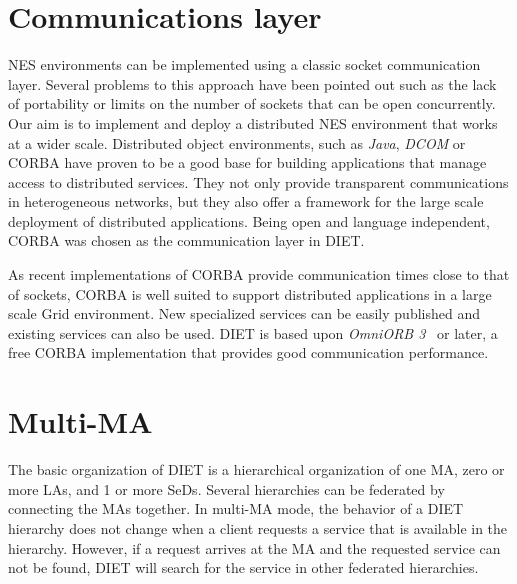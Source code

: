 
\section{Communications layer}
\label{sec:CORBA}

NES environments can be implemented using a classic socket
communication layer.  Several problems to this approach have been
pointed out such as the lack of portability or limits on the
number of sockets that can be open concurrently.
Our aim is to implement and deploy a distributed NES
environment that works at a wider scale. Distributed object
environments, such as \emph{Java}, \emph{DCOM} or CORBA have proven to
be a good base for building applications that manage access to
distributed services. They not only provide transparent communications
in heterogeneous networks, but they also offer a framework for the
large scale deployment of distributed applications. Being open and
language independent, CORBA was chosen as the communication layer in
DIET.

As recent implementations of CORBA provide communication times close to
that of sockets, CORBA is well suited to support distributed 
applications in a large scale Grid environment. New specialized
services can be easily published and existing services can also be
used.  DIET is based upon \emph{OmniORB 3}~\cite{OMNIORB} or later,
a free CORBA implementation that provides good communication
performance.


\section{Multi-MA}
\label{init:multima}

The basic organization of DIET is a hierarchical organization of one
MA, zero or more LAs, and 1 or more SeDs. Several hierarchies can be
federated by connecting the MAs together. In multi-MA mode, the
behavior of a DIET hierarchy does not change when a client requests
a service that is available in the hierarchy.  However, if a request
arrives at the MA and the requested service can not be found, DIET
will search for the service in other federated hierarchies.


